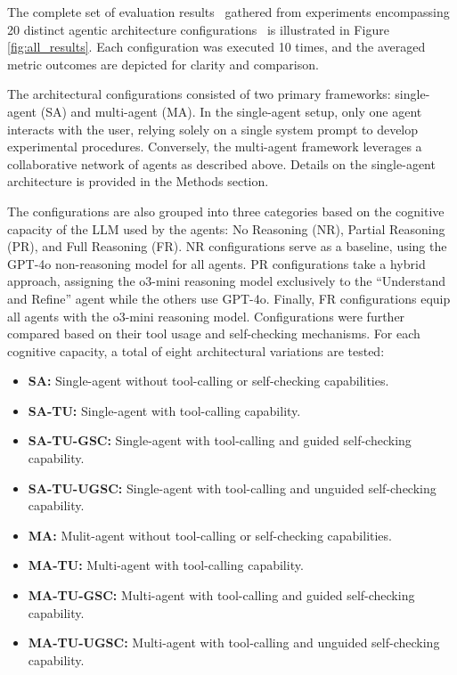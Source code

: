 \documentclass[sn-nature, twocolumn]{sn-jnl}%
\theoremstyle{thmstyleone}%
\theoremstyle{thmstyletwo}%
\theoremstyle{thmstylethree}%
\begin{document}
The complete set of evaluation results \textemdash ~gathered from experiments encompassing 20 distinct agentic architecture configurations \textemdash ~is illustrated in Figure \ref{fig:all_results}. Each configuration was executed 10 times, and the averaged metric outcomes are depicted for clarity and comparison.

The architectural configurations consisted of two primary frameworks: single-agent (SA) and multi-agent (MA). In the single-agent setup, only one agent interacts with the user, relying solely on a single system prompt to develop experimental procedures. Conversely, the multi-agent framework leverages a collaborative network of agents as described above. Details on the single-agent architecture is provided in the Methods section.

The configurations are also grouped into three categories based on the cognitive capacity of the LLM used by the agents:
No Reasoning (NR), Partial Reasoning (PR), and Full Reasoning (FR). NR configurations serve as a baseline, using the GPT-4o non-reasoning model for all agents. PR configurations take a hybrid approach, assigning the o3-mini reasoning model exclusively to the ``Understand and Refine'' agent while the others use GPT-4o. Finally, FR configurations equip all agents with the o3-mini reasoning model. Configurations were further compared based on their tool usage and self-checking mechanisms. For each cognitive capacity, a total of eight architectural variations are tested: 

\begin{itemize}
    \item \textbf{SA:} Single-agent without tool-calling or self-checking capabilities.
    \item \textbf{SA-TU:} Single-agent with tool-calling capability. 
    \item \textbf{SA-TU-GSC:} Single-agent with tool-calling and guided self-checking capability.
    \item \textbf{SA-TU-UGSC:} Single-agent with tool-calling and unguided self-checking capability.  
    \item \textbf{MA:} Mulit-agent without tool-calling or self-checking capabilities.
    \item \textbf{MA-TU:} Multi-agent with tool-calling capability.  
    \item \textbf{MA-TU-GSC:} Multi-agent with tool-calling and guided self-checking capability.
    \item \textbf{MA-TU-UGSC:} Multi-agent with tool-calling and unguided self-checking capability.

\end{itemize}
\end{document}
